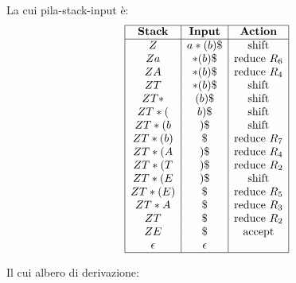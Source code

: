 {    La cui pila-stack-input è:
    \[
        \begin{array}{|c|c|c|}
            \hline
            \textbf{Stack} & \textbf{Input} & \textbf{Action} \\
            \hline
            Z & a \ast (b) \$ & \text{shift} \\
            Z a & \ast (b) \$ & \text{reduce } R_6 \\
            Z A & \ast (b) \$ & \text{reduce } R_4 \\
            Z T & \ast (b) \$ & \text{shift} \\
            Z T \ast & (b) \$ & \text{shift} \\
            Z T \ast ( & b) \$ & \text{shift} \\
            Z T \ast ( b & ) \$ & \text{shift} \\
            Z T \ast ( b ) & \$ & \text{reduce } R_7 \\
            Z T \ast ( A & ) \$ & \text{reduce } R_4 \\
            Z T \ast ( T & ) \$ & \text{reduce } R_2 \\
            Z T \ast ( E & ) \$ & \text{shift} \\
            Z T \ast ( E ) & \$ & \text{reduce } R_5 \\
            Z T \ast A & \$ & \text{reduce } R_3 \\
            Z T & \$ & \text{reduce } R_2 \\
            Z E & \$ & \text{accept} \\
            \epsilon &\epsilon & \\
            \hline
        \end{array}
    \]

    Il cui albero di derivazione:
    \begin{center}
    \end{center}



}

